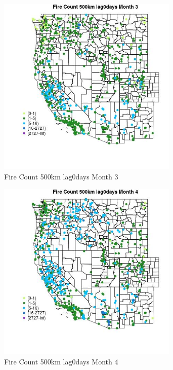 \begin{figure} 
\centering  
\includegraphics[width=0.77\textwidth]{Code_Outputs/Report_ML_input_PM25_Step4_part_f_de_duplicated_aves_prioritize_24hr_obswNAs_MapObsMo3Fire_Count_500km_lag0days.jpg} 
\caption{\label{fig:Report_ML_input_PM25_Step4_part_f_de_duplicated_aves_prioritize_24hr_obswNAsMapObsMo3Fire_Count_500km_lag0days}Fire Count 500km lag0days Month 3} 
\end{figure} 
 

\begin{figure} 
\centering  
\includegraphics[width=0.77\textwidth]{Code_Outputs/Report_ML_input_PM25_Step4_part_f_de_duplicated_aves_prioritize_24hr_obswNAs_MapObsMo4Fire_Count_500km_lag0days.jpg} 
\caption{\label{fig:Report_ML_input_PM25_Step4_part_f_de_duplicated_aves_prioritize_24hr_obswNAsMapObsMo4Fire_Count_500km_lag0days}Fire Count 500km lag0days Month 4} 
\end{figure} 
 

